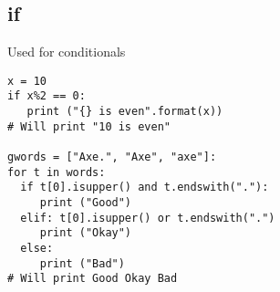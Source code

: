 \subsection{if}
Used for conditionals

\begin{lstlisting}
x = 10
if x%2 == 0:
   print ("{} is even".format(x))
# Will print "10 is even"

gwords = ["Axe.", "Axe", "axe"]:
for t in words:
  if t[0].isupper() and t.endswith("."):
     print ("Good")
  elif: t[0].isupper() or t.endswith(".")
     print ("Okay")  
  else:
     print ("Bad")
# Will print Good Okay Bad
\end{lstlisting}


